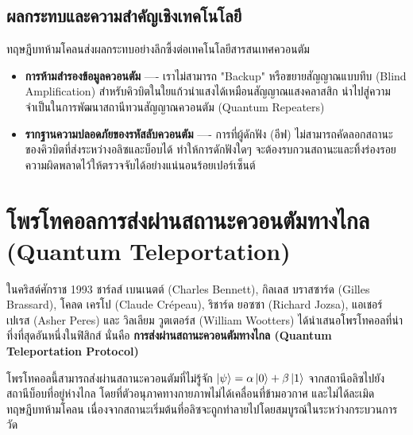 \subsection{ผลกระทบและความสำคัญเชิงเทคโนโลยี}
ทฤษฎีบทห้ามโคลนส่งผลกระทบอย่างลึกซึ้งต่อเทคโนโลยีสารสนเทศควอนตัม
\begin{itemize}
    \item \textbf{การห้ามสำรองข้อมูลควอนตัม} ---- เราไม่สามารถ "Backup" หรือขยายสัญญาณแบบทึบ (Blind Amplification) สำหรับคิวบิตในใยแก้วนำแสงได้เหมือนสัญญาณแสงคลาสสิก นำไปสู่ความจำเป็นในการพัฒนาสถานีทวนสัญญาณควอนตัม (Quantum Repeaters)
    \item \textbf{รากฐานความปลอดภัยของรหัสลับควอนตัม} ---- การที่ผู้ดักฟัง (อีฟ) ไม่สามารถคัดลอกสถานะของคิวบิตที่ส่งระหว่างอลิซและบ็อบได้ ทำให้การดักฟังใดๆ จะต้องรบกวนสถานะและทิ้งร่องรอยความผิดพลาดไว้ให้ตรวจจับได้อย่างแน่นอนร้อยเปอร์เซ็นต์
\end{itemize}

\section{โพรโทคอลการส่งผ่านสถานะควอนตัมทางไกล (Quantum Teleportation)}

ในคริสต์ศักราช 1993 ชาร์ลส์ เบนเนตต์ (Charles Bennett), กิลเลส บราสซาร์ด (Gilles Brassard), โคลด เครโป (Claude Crépeau), ริชาร์ด ยอซซา (Richard Jozsa), แอเชอร์ เปเรส (Asher Peres) และ วิลเลียม วูตเตอร์ส (William Wootters) ได้นำเสนอโพรโทคอลที่น่าทึ่งที่สุดอันหนึ่งในฟิสิกส์ นั่นคือ \textbf{การส่งผ่านสถานะควอนตัมทางไกล (Quantum Teleportation Protocol)}

โพรโทคอลนี้สามารถส่งผ่านสถานะควอนตัมที่ไม่รู้จัก $\ket{\psi} = \alpha\ket{0} + \beta\ket{1}$ จากสถานีอลิซไปยังสถานีบ็อบที่อยู่ห่างไกล โดยที่ตัวอนุภาคทางกายภาพไม่ได้เคลื่อนที่ข้ามอวกาศ และไม่ได้ละเมิดทฤษฎีบทห้ามโคลน เนื่องจากสถานะเริ่มต้นที่อลิซจะถูกทำลายไปโดยสมบูรณ์ในระหว่างกระบวนการวัด

